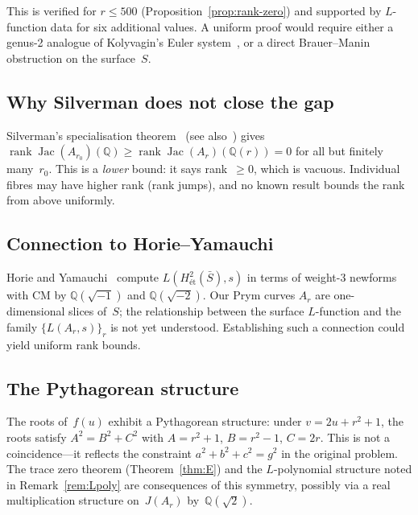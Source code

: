 \documentclass[11pt]{amsart}
\theoremstyle{plain}
\theoremstyle{definition}
\theoremstyle{remark}
\newcommand{\QQ}{\mathbb{Q}}
\newcommand{\Jac}{\operatorname{Jac}}
\newcommand{\rank}{\operatorname{rank}}
\begin{document}
This is verified for $r\le 500$ (Proposition~\ref{prop:rank-zero}) and supported
by $L$-function data for six additional values.  A uniform proof would require
either a genus-2 analogue of Kolyvagin's Euler system~\cite{Kolyvagin1990},
or a direct Brauer--Manin obstruction on the surface~$S$.

\subsection{Why Silverman does not close the gap}

Silverman's specialisation theorem~\cite{Silverman1983}
(see also~\cite[Chapter~III]{SilvermanAEC}) gives
$\rank\Jac(A_{r_0})(\QQ)\ge\rank\Jac(A_r)(\QQ(r))=0$
for all but finitely many~$r_0$.  This is a \emph{lower} bound: it says rank~$\ge 0$, which is
vacuous.  Individual fibres may have higher rank (rank jumps), and
no known result bounds the rank from above uniformly.

\subsection{Connection to Horie--Yamauchi}

Horie and Yamauchi~\cite{HorieYamauchi2025} compute
$L(H^2_{\text{\'et}}(\bar{S}),s)$ in terms of weight-3 newforms
with CM by $\QQ(\sqrt{-1})$ and $\QQ(\sqrt{-2})$.  Our Prym curves $A_r$ are
one-dimensional slices of~$S$; the relationship between the surface $L$-function
and the family $\{L(A_r,s)\}_r$ is not yet understood.  Establishing such a
connection could yield uniform rank bounds.

\subsection{The Pythagorean structure}

The roots of~$f(u)$ exhibit a Pythagorean structure: under
$v=2u+r^2+1$, the roots satisfy $A^2=B^2+C^2$ with
$A=r^2+1$, $B=r^2-1$, $C=2r$.
This is not a coincidence---it reflects the constraint $a^2+b^2+c^2=g^2$
in the original problem.  The trace zero theorem (Theorem~\ref{thm:E}) and the
$L$-polynomial structure noted in Remark~\ref{rem:Lpoly} are
consequences of this symmetry, possibly via a real multiplication structure
on~$J(A_r)$ by~$\QQ(\sqrt{2})$.

\end{document}
